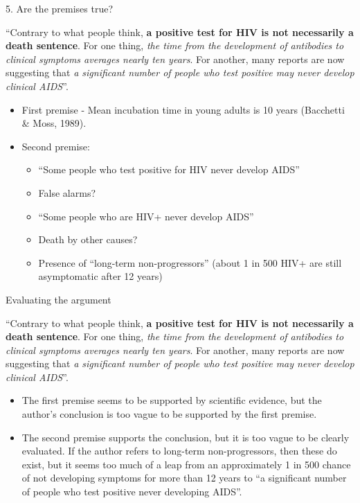 \documentclass{beamer}
\begin{document}



\begin{frame}{5. Are the premises true?}

	``Contrary to what people think, \textbf{a positive test for HIV is not necessarily a death sentence}. For one thing, \emph{the time from the development of antibodies to clinical symptoms averages nearly ten years}. For another, many reports are now suggesting that \emph{a significant number of people who test positive may never develop clinical AIDS}''.

\begin{itemize}
\item First premise - Mean incubation time in young adults is 10 years (Bacchetti \& Moss, 1989).
\item Second premise:
\begin{itemize}
\item ``Some people who test positive for HIV never develop AIDS''
\item False alarms?
\item ``Some people who are HIV+ never develop AIDS''
\item Death by other causes?
\item Presence of ``long-term non-progressors'' (about 1 in 500 HIV+ are still asymptomatic after 12 years)
\end{itemize}
\end{itemize}
\end{frame}

\begin{frame}{Evaluating the argument}

	``Contrary to what people think, \textbf{a positive test for HIV is not necessarily a death sentence}. For one thing, \emph{the time from the development of antibodies to clinical symptoms averages nearly ten years}. For another, many reports are now suggesting that \emph{a significant number of people who test positive may never develop clinical AIDS}''.
	

\begin{itemize}
\item The first premise seems to be supported by scientific evidence, but the author's conclusion is too vague to be supported by the first premise.
\item The second premise supports the conclusion, but it is too vague to be clearly evaluated. If the author refers to long-term non-progressors, then these do exist, but it seems too much of a leap from an approximately 1 in 500 chance of not developing symptoms for more than 12 years to ``a significant number of people who test positive never developing AIDS''. 
\end{itemize}
\end{frame}
\end{document}

